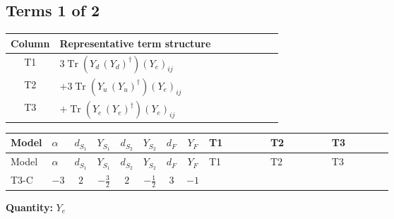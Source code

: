 \documentclass[8pt]{article}
\begin{document}
\begin{landscape}
\subsection*{Terms 1 of 2}
\begin{center}
\begin{tabular}{@{}c >{\raggedright\arraybackslash}p{0.82\linewidth}@{}}
\toprule
Column & Representative term structure \\
\midrule
T1 & \(\displaystyle 3 \operatorname{Tr}\!\left({Y_d}\,\left({Y_d}\right)^{\dagger}\right) \left({Y_e}\right)_{ij}\) \\
\midrule
T2 & \(\displaystyle +3 \operatorname{Tr}\!\left({Y_u}\,\left({Y_u}\right)^{\dagger}\right) \left({Y_e}\right)_{ij}\) \\
\midrule
T3 & \(\displaystyle +\operatorname{Tr}\!\left({Y_e}\,\left({Y_e}\right)^{\dagger}\right) \left({Y_e}\right)_{ij}\) \\
\midrule
\bottomrule
\end{tabular}
\end{center}
\smallskip
\tiny
\begin{longtable}{@{}llcccccc >{\raggedright\arraybackslash}p{0.21\linewidth} >{\raggedright\arraybackslash}p{0.21\linewidth} >{\raggedright\arraybackslash}p{0.21\linewidth}@{}}
\toprule
Model & $\alpha$ & $d_{S_1}$ & $Y_{S_1}$ & $d_{S_2}$ & $Y_{S_2}$ & $d_F$ & $Y_F$ & T1 & T2 & T3 \\
\midrule
\endfirsthead
\toprule
Model & $\alpha$ & $d_{S_1}$ & $Y_{S_1}$ & $d_{S_2}$ & $Y_{S_2}$ & $d_F$ & $Y_F$ & T1 & T2 & T3 \\
\midrule
\endhead
T3-C & $-3$ & $2$ & $-\frac{3}{2}$ & $2$ & $-\frac{1}{2}$ & $3$ & $-1$ & \scriptsize\adjustbox{max width=\linewidth}{$\begin{gathered} 3 \operatorname{Tr}\!\left({Y_d}\,\left({Y_d}\right)^{\dagger}\right) \left({Y_e}\right)_{ij}\end{gathered}$} & \scriptsize\adjustbox{max width=\linewidth}{$\begin{gathered} +3 \operatorname{Tr}\!\left({Y_u}\,\left({Y_u}\right)^{\dagger}\right) \left({Y_e}\right)_{ij}\end{gathered}$} & \scriptsize\adjustbox{max width=\linewidth}{$\begin{gathered} +\operatorname{Tr}\!\left({Y_e}\,\left({Y_e}\right)^{\dagger}\right) \left({Y_e}\right)_{ij}\end{gathered}$} \\
\midrule
\bottomrule
\end{longtable}
\clearpage
\noindent\textbf{Quantity: }$Y_e$\par\smallskip

\end{landscape}
\end{document}

